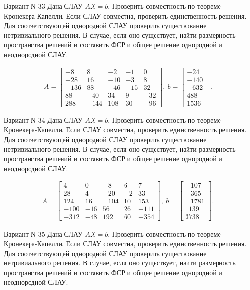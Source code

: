 \documentclass[11pt]{report}
\begin{document}
Вариант N 33
Дана СЛАУ $AX = b$,
Проверить совместность по теореме Кронекера-Капелли. Если СЛАУ совместна, проверить единственность решения.
Для соответствующей однородной СЛАУ проверить существование нетривиального решения. В случае, если оно существует,
найти размерность пространства решений и составить ФСР и общее решение однородной  и неоднородной СЛАУ.


\begin{align*}
 A = \left[\begin{matrix}-8 & 8 & -2 & -1 & 0\\-28 & 16 & -10 & -3 & 8\\-136 & 88 & -46 & -15 & 32\\88 & -40 & 34 & 9 & -32\\288 & -144 & 108 & 30 & -96\end{matrix}\right],
\ b = \left[\begin{matrix}-24\\-140\\-632\\488\\1536\end{matrix}\right]. 
 \end{align*}

Вариант N 34
Дана СЛАУ $AX = b$,
Проверить совместность по теореме Кронекера-Капелли. Если СЛАУ совместна, проверить единственность решения.
Для соответствующей однородной СЛАУ проверить существование нетривиального решения. В случае, если оно существует,
найти размерность пространства решений и составить ФСР и общее решение однородной  и неоднородной СЛАУ.


\begin{align*}
 A = \left[\begin{matrix}4 & 0 & -8 & 6 & 7\\28 & 4 & -20 & -2 & 33\\124 & 16 & -104 & 10 & 153\\-100 & -16 & 56 & 26 & -111\\-312 & -48 & 192 & 60 & -354\end{matrix}\right],
\ b = \left[\begin{matrix}-107\\-365\\-1781\\1139\\3738\end{matrix}\right]. 
 \end{align*}

Вариант N 35
Дана СЛАУ $AX = b$,
Проверить совместность по теореме Кронекера-Капелли. Если СЛАУ совместна, проверить единственность решения.
Для соответствующей однородной СЛАУ проверить существование нетривиального решения. В случае, если оно существует,
найти размерность пространства решений и составить ФСР и общее решение однородной  и неоднородной СЛАУ.
\end{document}
